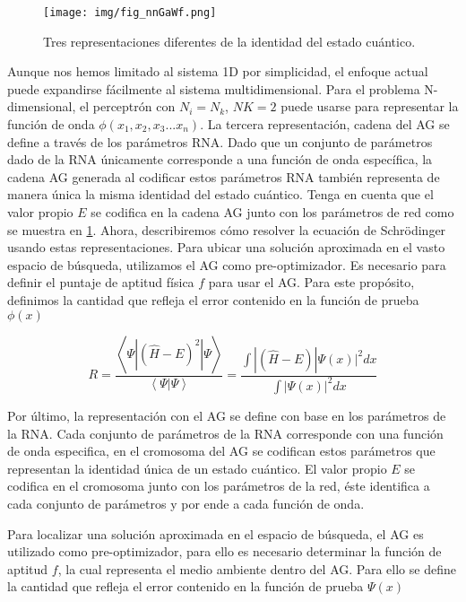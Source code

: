 \begin{figure}[H]
	\centering
	\texttt{[image: img/fig\_nnGaWf.png]}
	\caption{Tres representaciones diferentes de la identidad del estado cu\'antico.}
	\label{fig:nnGaWf}
\end{figure}

Aunque nos hemos limitado al sistema 1D por simplicidad, el enfoque
actual puede expandirse f\'acilmente al sistema multidimensional. Para
el problema N-dimensional, el perceptr\'on con $N_i = N_k$, $NK = 2$ puede
usarse para representar la funci\'on de onda $\phi(x_1,x_2,x_3...x_n)$.
La tercera representaci\'on, cadena del AG se define a trav\'es de los par\'ametros
RNA. Dado que un conjunto de par\'ametros dado de la RNA \'unicamente
corresponde a una funci\'on de onda espec\'ifica, la cadena AG generada
al codificar estos par\'ametros RNA tambi\'en representa de manera \'unica
la misma identidad del estado cu\'antico. Tenga en cuenta que el valor
propio $E$ se codifica en la cadena AG junto con los par\'ametros de red
como se muestra en \ref{fig:nnGaWf}.
Ahora, describiremos c\'omo resolver la ecuaci\'on de Schr\"odinger usando
estas representaciones. Para ubicar una soluci\'on aproximada en el vasto
espacio de b\'usqueda, utilizamos el AG como pre-optimizador. Es necesario
para definir el puntaje de aptitud f\'isica $f$ para usar el AG. Para este
prop\'osito, definimos la cantidad que refleja el error contenido en la
funci\'on de prueba $\phi(x)$

\begin{equation}
	R=\frac{\left\langle\Psi|(\hat{H}-E)^2|\Psi\right\rangle}{\left\langle\Psi|\Psi\right\rangle}=\frac{\int|(\hat{H}-E)|\Psi(x)|^2 dx}{\int|\Psi(x)|^2 dx}
	\label{error}
\end{equation}

Por \'ultimo, la representaci\'on con el AG se define con base en
los par\'ametros de la RNA. Cada conjunto de par\'ametros de
la RNA corresponde con una funci\'on de onda especifica, en
el cromosoma del AG se codifican estos par\'ametros que representan
la identidad \'unica de un estado cu\'antico. El valor
propio $E$ se codifica en el cromosoma junto con los par\'ametros
de la red, \'este identifica a cada conjunto de par\'ametros y
por ende a cada funci\'on de onda.

Para localizar una soluci\'on aproximada en el espacio de
b\'usqueda, el AG es utilizado como pre-optimizador, para ello
es necesario determinar la funci\'on de aptitud $f$, la cual
representa el medio ambiente dentro del AG. Para ello se define la
cantidad que refleja el error contenido en la funci\'on de prueba
$\Psi(x)$


